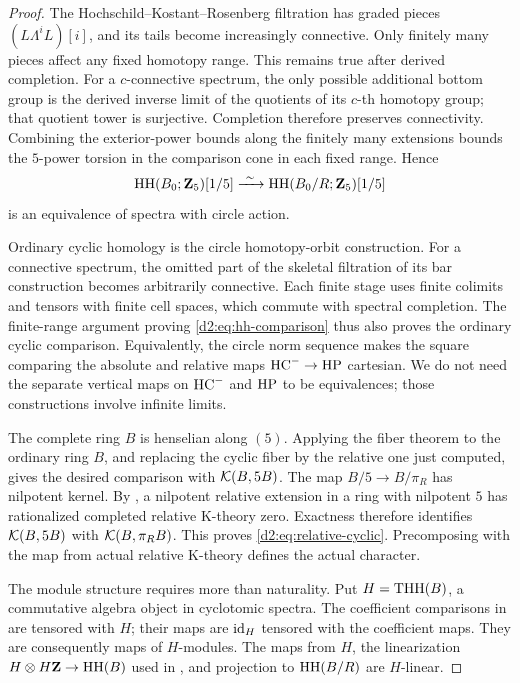 \begin{proof}
The Hochschild--Kostant--Rosenberg filtration has graded pieces
\((L\!\Lambda^iL)[i]\), and its tails become increasingly connective.
Only finitely many pieces affect any fixed homotopy range.
This remains true after derived completion.
For a \(c\)-connective spectrum, the only possible additional bottom
group is the derived inverse limit of the quotients of its
\(c\)-th homotopy group; that quotient tower is surjective.
Completion therefore preserves connectivity.
Combining the exterior-power bounds along the finitely many
extensions bounds the \(5\)-power torsion in the comparison cone in
each fixed range. Hence
\begin{equation}\label{d2:eq:hh-comparison}
 \operatorname{HH}(B_0;\mathbf{Z}_5)[1/5]
 \xrightarrow{\ \sim\ }
 \operatorname{HH}(B_0/R;\mathbf{Z}_5)[1/5]
\end{equation}
is an equivalence of spectra with circle action.

Ordinary cyclic homology is the circle homotopy-orbit construction.
For a connective spectrum, the omitted part of the skeletal
filtration of its bar construction becomes arbitrarily connective.
Each finite stage uses finite colimits and tensors with finite cell
spaces, which commute with spectral completion.
The finite-range argument proving \eqref{d2:eq:hh-comparison} thus
also proves the ordinary cyclic comparison.
Equivalently, the circle norm sequence makes the square comparing
the absolute and relative maps \(\operatorname{HC}^-\to\operatorname{HP}\) cartesian.
We do not need the separate vertical maps on \(\operatorname{HC}^-\) and \(\operatorname{HP}\)
to be equivalences; those constructions involve infinite limits.

The complete ring \(B\) is henselian along \((5)\).
Applying the fiber theorem to the ordinary ring \(B\), and replacing
the cyclic fiber by the relative one just computed, gives the desired
comparison with \(\mathcal K(B,5B)\).
The map \(B/5\to B/\pi_R\) has nilpotent kernel.
By \cite[Corollary~3.8]{AMMN}, a nilpotent relative extension in
a ring with nilpotent \(5\) has rationalized completed relative
K-theory zero. Exactness therefore identifies
\(\mathcal K(B,5B)\) with \(\mathcal K(B,\pi_RB)\).
This proves \eqref{d2:eq:relative-cyclic}.
Precomposing with the map from actual relative K-theory defines the
actual character.

The module structure requires more than naturality.
Put \(H=\operatorname{THH}(B)\), a commutative algebra object in cyclotomic spectra.
The coefficient comparisons in
\cite[Proposition~2.8 and Corollary~2.10]{AMMN}
are tensored with \(H\); their maps are
\(\mathrm{id}_H\) tensored with the coefficient maps.
They are consequently maps of \(H\)-modules.
The maps from \(H\), the linearization
\(H\otimes H\mathbf{Z}\to\operatorname{HH}(B)\) used in
\cite[Theorem~2.12]{AMMN}, and projection to
\(\operatorname{HH}(B/R)\) are \(H\)-linear.


\end{proof}
